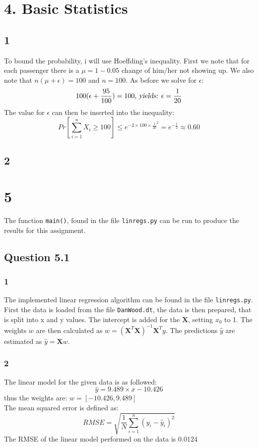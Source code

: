 \documentclass{article}
\begin{document}
\section{4. Basic Statistics}
\subsection{1}
To bound the probability, i will use Hoeffding's inequality. First we note that for each passenger there is a $\mu = 1-0.05$ change of him/her not showing up. We also note that $n(\mu + \epsilon) = 100$ and $n=100$. As before we solve for $\epsilon$:
$$ 
100(\epsilon + \frac{95}{100}) = 100 \textsl{, yields: } \epsilon = \dfrac{1}{20}
$$
The value for $\epsilon$ can then be inserted into the inequality:
\begin{equation*}
Pr \left[ \sum\limits^{n}_{i=1}X_i \geq 100 \right] \leq e^{-2 \times 100 \times \frac{1}{20}^2} = e^{-\frac{1}{2}}  \approx 0.60
\end{equation*}
\subsection{2}
\section{5}
The function \texttt{main()}, found in the file \texttt{linregs.py} can be run to produce the results for this assignment.
\subsection{Question 5.1}
\subsubsection{1}
The implemented linear regression algorithm can be found in the file \texttt{linregs.py}. \\
First the data is loaded from the file \texttt{DanWood.dt}, the data is then prepared, that is split into x and y values. The intercept is added for the $\mathbf{X}$, setting $x_0$ to 1. The weights $w$ are then calculated as  $w = (\mathbf{X}^T \mathbf{X})^{-1}\mathbf{X}^T y$. The predictions $\hat{y}$ are estimated as $ \hat{y} = \mathbf{X}w$.
\subsubsection{2}
The linear model for the given data is as followed: 
$$ \hat{y} = 9.489 \times x - 10.426 $$
thus the weights are: $w=[-10.426,9.489]$ \\ The mean squared error is defined as:
\begin{equation*}
RMSE = \sqrt{ \dfrac{1}{N} \sum\limits^{n}_{i=1} (y_i - \hat{y}_i )^2}
\end{equation*}
The RMSE of the linear model performed on the data is $0.0124$
\end{document}

